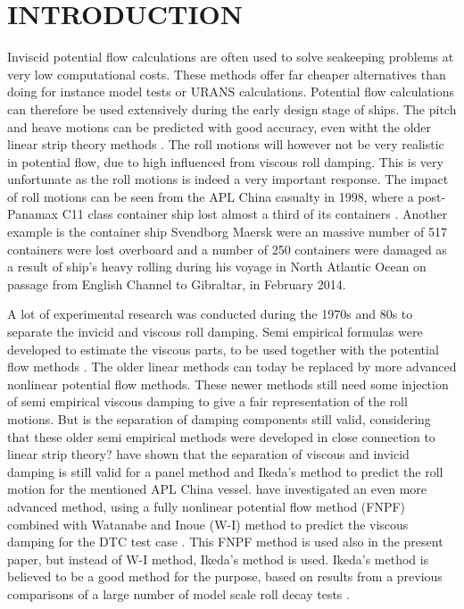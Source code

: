 \section*{INTRODUCTION}\label{introduction}

Inviscid potential flow calculations are often used to solve seakeeping
problems at very low computational costs. These methods offer far
cheaper alternatives than doing for instance model tests or URANS
calculations. Potential flow calculations can therefore be used
extensively during the early design stage of ships. The pitch and heave
motions can be predicted with good accuracy, even witht the older linear
strip theory methods \citep{7505983/FB64RGPF}. The roll motions will
however not be very realistic in potential flow, due to high influenced
from viscous roll damping. This is very unfortunate as the roll motions
is indeed a very important response. The impact of roll motions can be
seen from the APL China casualty in 1998, where a post-Panamax C11 class
container ship lost almost a third of its containers
\citep{7505983/WPADAQB3}. Another example is the container ship Svendborg
Maersk were an massive number of 517 containers were lost overboard and
a number of 250 containers were damaged as a result of ship's heavy
rolling during his voyage in North Atlantic Ocean on passage from
English Channel to Gibraltar, in February 2014\citep{7505983/T78CMTDR}.

\quad A lot of experimental research was conducted during the 1970s and
80s to separate the invicid and viscous roll damping. Semi empirical
formulas were developed to estimate the viscous parts, to be used
together with the potential flow methods \citep{7505983/937PN5DT}. The
older linear methods can today be replaced by more advanced nonlinear
potential flow methods. These newer methods still need some injection of
semi empirical viscous damping to give a fair representation of the roll
motions. But is the separation of damping components still valid,
considering that these older semi empirical methods were developed in
close connection to linear strip theory? \citep{7505983/UGK6YEVD} have
shown that the separation of viscous and invicid damping is still valid
for a panel method and Ikeda's method to predict the roll motion for the
mentioned APL China vessel. \citep{7505983/24TNAV5Z} have investigated an
even more advanced method, using a fully nonlinear potential flow method
(FNPF) \citep{7505983/P4XDUMMQ} combined with Watanabe and Inoue (W-I)
method \citep{7505983/ARMIRMVY} to predict the viscous damping for the
DTC test case \citep{7505983/BYNJ8CFG}. This FNPF method is used also in
the present paper, but instead of W-I method, Ikeda's method is used.
Ikeda's method is believed to be a good method for the purpose, based on
results from a previous comparisons of a large number of model scale
roll decay tests \citep{7505983/QMGQ76Q9}.

